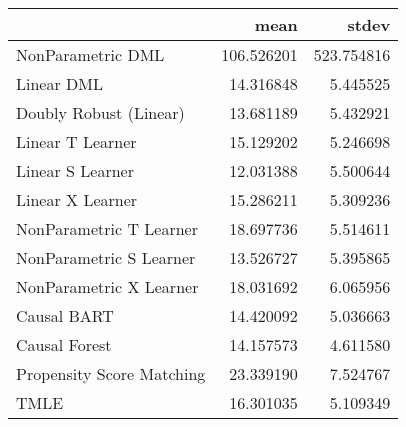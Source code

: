 \begin{tabular}{lrr}
\toprule
{} &        mean &       stdev \\
\midrule
NonParametric DML         &  106.526201 &  523.754816 \\
Linear DML                &   14.316848 &    5.445525 \\
Doubly Robust (Linear)    &   13.681189 &    5.432921 \\
Linear T Learner          &   15.129202 &    5.246698 \\
Linear S Learner          &   12.031388 &    5.500644 \\
Linear X Learner          &   15.286211 &    5.309236 \\
NonParametric T Learner   &   18.697736 &    5.514611 \\
NonParametric S Learner   &   13.526727 &    5.395865 \\
NonParametric X Learner   &   18.031692 &    6.065956 \\
Causal BART               &   14.420092 &    5.036663 \\
Causal Forest             &   14.157573 &    4.611580 \\
Propensity Score Matching &   23.339190 &    7.524767 \\
TMLE                      &   16.301035 &    5.109349 \\
\bottomrule
\end{tabular}
